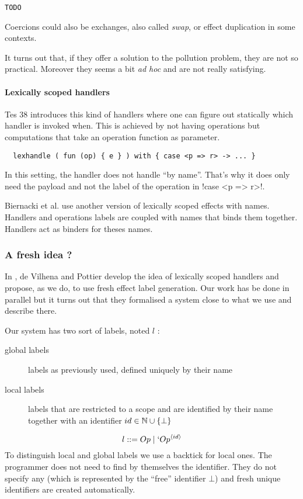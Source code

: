 \documentclass[11pt, nonacm=true, language=french, language=english]{acmart}
\begin{document}
\begin{lstlisting}[caption=Mask coercion example]
  TODO
\end{lstlisting}

Coercions could also be exchanges, also called \emph{swap}, or effect duplication in some contexts.

It turns out that, if they offer a solution to the pollution problem, they are not so practical. Moreover they seems a bit \emph{ad hoc} and are not really satisfying.

\paragraph{Lexically scoped handlers}
\cite{} Tes 38 introduces this kind of handlers where one can figure out statically which handler is invoked when. This is achieved by not having operations but computations that take an operation function as parameter.
\begin{lstlisting}
  lexhandle ( fun (op) { e } ) with { case <p => r> -> ... }
\end{lstlisting}
\begin{rem}
  In this setting, the handler does not handle ``by name''. That's why it does only need the payload and not the label of the operation in !case <p => r>!.
\end{rem}

Biernacki et al. \cite{binders-labels} use another version of lexically scoped effects with names. Handlers and operations labels are coupled with names that binds them together. Handlers act as binders for theses names.

\subsubsection{A fresh idea ?}
\label{sec:fresh-idea}

In \cite{tes}, de Vilhena and Pottier develop the idea of lexically scoped handlers and propose, as we do, to use fresh effect label generation. Our work has be done in parallel but it turns out that they formalised a system close to what we use and describe there.

Our system has two sort of labels, noted $l$ :
\begin{description}
  \item[global labels] labels as previously used, defined uniquely by their name
  \item[local labels] labels that are restricted to a scope and are identified by their name together with an identifier $id \in \mathbb N \cup \{\bot\}$
\end{description}
$$ l ::= Op \mid `Op^{\langle id\rangle} $$
To distinguish local and global labels we use a backtick for local ones. The programmer does not need to find by themselves the identifier. They do not specify any (which is represented by the ``free'' identifier $\bot$) and fresh unique identifiers are created automatically.
\end{document}
